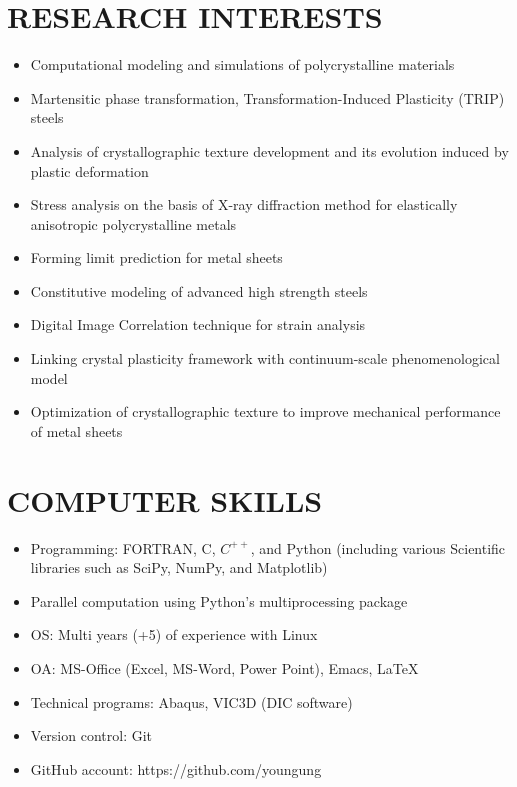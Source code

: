 \documentclass{res}
\begin{document}
\begin{resume}
  \section{RESEARCH INTERESTS}
  \begin{itemize}
  \item Computational modeling and simulations of polycrystalline materials
  \item Martensitic phase transformation, Transformation-Induced Plasticity (TRIP) steels
  \item Analysis of crystallographic texture development and its evolution induced by plastic deformation
  \item Stress analysis on the basis of X-ray diffraction method for elastically anisotropic polycrystalline metals
  \item Forming limit prediction for metal sheets
  \item Constitutive modeling of advanced high strength steels
  \item Digital Image Correlation technique for strain analysis
  \item Linking crystal plasticity framework with continuum-scale phenomenological model
  \item Optimization of crystallographic texture to improve mechanical performance of metal sheets
  \end{itemize}

  \section{COMPUTER SKILLS}
  \begin{itemize}
  \item Programming: FORTRAN, C, $C^{++}$, and Python (including various Scientific libraries such as SciPy, NumPy, and Matplotlib)
  \item Parallel computation using Python's multiprocessing package
  \item OS: Multi years (+5) of experience with Linux
  \item OA: MS-Office (Excel, MS-Word, Power Point), Emacs, \LaTeX
  \item Technical programs: Abaqus, VIC3D (DIC software)
  \item Version control: Git
  \item GitHub account: https://github.com/youngung
  \end{itemize}


\end{resume}
\end{document}
